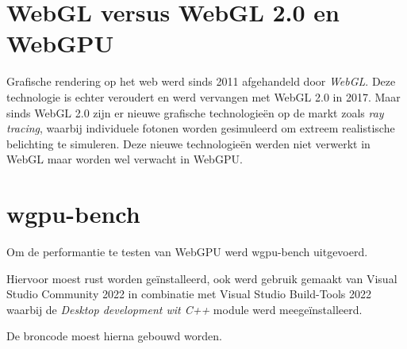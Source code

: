 \section{WebGL versus WebGL 2.0 en WebGPU}

Grafische rendering op het web werd sinds 2011 afgehandeld door \textit{WebGL}. Deze technologie is echter veroudert en werd vervangen met WebGL 2.0 in 2017. Maar sinds WebGL 2.0 zijn er nieuwe grafische technologieën op de markt zoals \textit{ray tracing}, waarbij individuele fotonen worden gesimuleerd om extreem realistische belichting te simuleren. Deze nieuwe technologieën werden niet verwerkt in WebGL maar worden wel verwacht in WebGPU.

\section{wgpu-bench}

Om de performantie te testen van WebGPU werd wgpu-bench uitgevoerd.

Hiervoor moest rust worden geïnstalleerd, ook werd gebruik gemaakt van Visual Studio Community 2022 in combinatie met Visual Studio Build-Tools 2022 waarbij de \textit{Desktop development wit C++} module werd meegeïnstalleerd.

De broncode moest hierna gebouwd worden.